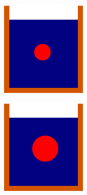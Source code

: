 \documentclass[preprint,12pt]{elsarticle}
\begin{document}
\begin{figure}[!htpb]
  \centering
  \begin{subfigure}{0.48\textwidth}
    \centering
    \includegraphics[width=0.45\textwidth]{images/hs_tank_with_spherical_particles_real_0_3}
    \label{fig:1-mixing-1-a}
  \end{subfigure}
  \begin{subfigure}{0.48\textwidth}
    \centering
    \includegraphics[width=0.45\textwidth]{images/hs_tank_with_spherical_particles_real_0_6}
    \label{fig:1-mixing-1-b}
  \end{subfigure}


\end{figure}
\end{document}
